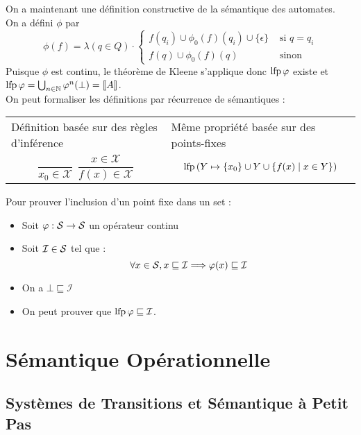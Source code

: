 \documentclass{cours}
\begin{document}
On a maintenant une définition constructive de la sémantique des automates.\\
On a défini $\phi$ par \[
    \phi(f) = \lambda(q \in Q) \cdot \begin{cases}
        f(q_{i}) \cup \phi_{0}(f)(q_{i}) \cup \{\epsilon\} & \text{ si } q = q_{i}\\
        f(q) \cup \phi_{0}(f)(q) & \text{ sinon}
    \end{cases}
\]
Puisque $\phi$ est continu, le théorème de Kleene s'applique donc $\operatorname{lfp}\varphi$ existe et $\operatorname{lfp}\varphi = \bigcup_{n \in \mathbb{N}}\varphi^{n}(\bot) = \left\llbracket A \right\rrbracket$.\\

On peut formaliser les définitions par récurrence de sémantiques : 
\begin{center}
    \begin{tabular}{m{.3\linewidth}m{.4\linewidth}}
        Définition basée sur des \newline règles d'inférence & Même propriété basée \newline sur des points-fixes\\
        \[
            \frac{}{x_{0} \in \mathcal{X}} \ \ \frac{x \in \mathcal{X}}{f(x) \in \mathcal{X}}
        \] 
        & 
        \[
            \operatorname{lfp}\left(Y \mapsto \{x_{0}\} \cup Y \cup \{f(x) \mid x \in Y\}\right)
        \]
    \end{tabular}
\end{center}

Pour prouver l'inclusion d'un point fixe dans un set : 
\begin{itemize}
    \item Soit $\varphi : \mathcal{S} \to \mathcal{S}$ un opérateur continu
    \item Soit $\mathcal{I} \in \mathcal{S}$ tel que : 
    \[
        \forall x \in \mathcal{S}, x \sqsubseteq \mathcal{I} \Longrightarrow \varphi(x) \sqsubseteq \mathcal{I}
    \]
    \item On a $\bot \sqsubseteq \mathcal{I}$
    \item On peut prouver que $\operatorname{lfp}\varphi \sqsubseteq \mathcal{I}$.
\end{itemize}

\section{Sémantique Opérationnelle}
\subsection{Systèmes de Transitions et Sémantique à Petit Pas}
\end{document}
